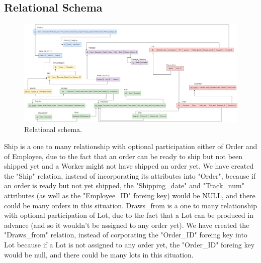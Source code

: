 \subsection{Relational Schema}
\begin{figure}[!h]
	\centering
	\includegraphics[width=1.3\linewidth,angle=270,origin=c]{Relational.png}
	\caption{Relational schema.}
	\label{fig:relational-schema}
\end{figure}
Ship is a one to many relationship with optional participation either of Order and of Employee, due to the fact that an order can be ready to ship but not been shipped yet and a Worker might not have shipped an order yet. We have created the "Ship" relation, instead of incorporating its attributes into "Order", because if an order is ready but not yet shipped, the "Shipping\_date" and "Track\_num" attributes (as well as the "Employee\_ID" foreing key) would be NULL, and there could be many orders in this situation.
Draws\_from is a one to many relationship with optional participation of Lot, due to the fact that a Lot can be produced in advance (and so it wouldn't be assigned to any order yet). We have created the "Draws\_from" relation, instead of corporating the "Order\_ID" foreing key into Lot because if a Lot is not assigned to any order yet, the "Order\_ID" foreing key would be null, and there could be many lots in this situation.